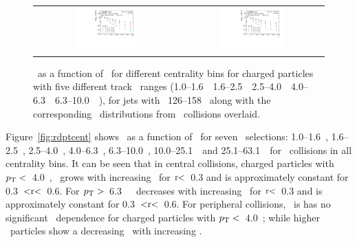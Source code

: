 \begin{figure}
{\begin{tabular}{cc}
	 \includegraphics[width=0.45\textwidth]{figures_results/ChPS_final_dR_CONF_DpT_data_jet7_cent4} &
	 \includegraphics[width=0.45\textwidth]{figures_results/ChPS_final_dR_CONF_DpT_data_jet7_cent5} \\
\end{tabular} }
   \caption{ \Dptr\ as a function of \rvar\ for different centrality bins for charged particles with five different track \pT\ ranges (1.0--1.6~\GeV\, 1.6--2.5~\GeV\, 2.5--4.0~\GeV\, 4.0--6.3~\GeV\, 6.3--10.0~\GeV\ ), for jets with \pt\ 126--158 \GeV\, along with the corresponding \Dptr\ distributions from \pp\ collisions overlaid. }
      \label{fig:dptr_pbpb_pp}
\end{figure}



Figure~\ref{fig:rdptcent} shows \RDptr\ as a function of \rvar\ for seven \pt\ selections: 1.0--1.6~\GeV, 1.6--2.5~\GeV, 2.5--4.0~\GeV, 4.0--6.3~\GeV, 6.3--10.0~\GeV, 10.0--25.1~\GeV\ and 25.1--63.1~\GeV\ for \pbpb\ collisions in all centrality bins. It can be seen that in central collisions, charged particles
with $p_{\mathrm{T}} <$~4.0~\GeV, \RDptr\ grows with increasing \rvar\ for $\rvar <$~0.3 and is approximately constant for
0.3~$<\rvar <$~0.6.  For $p_{\mathrm{T}} > $~6.3~\GeV\ \RDptr\ decreases with increasing \rvar\ for $\rvar <$~0.3
and is approximately constant for 0.3~$<\rvar <$~0.6.
For peripheral collisions, \RDptr\ is has no significant \rvar\ dependence for
 charged particles with  $p_{\mathrm{T}} <$~4.0~\GeV; while higher \pt\ particles show a decreasing \RDptr\ with increasing \rvar.

